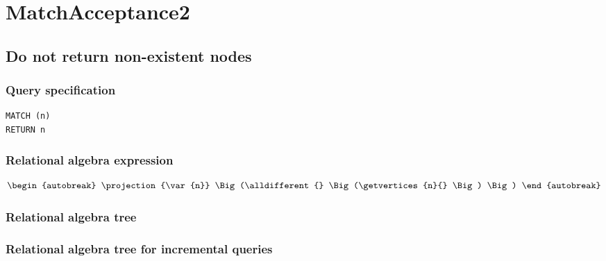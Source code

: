 \section{MatchAcceptance2}


\subsection{Do not return non-existent nodes}

\subsubsection*{Query specification}

\begin{lstlisting}
MATCH (n)
RETURN n
\end{lstlisting}

\subsubsection*{Relational algebra expression}

\begin{align*}
\begin{autobreak}
\projection{\var{n}} \Big(\alldifferent{} \Big(\getvertices{n}{}
\Big)
\Big)
\end{autobreak}
\end{align*}

\subsubsection*{Relational algebra tree}


\subsubsection*{Relational algebra tree for incremental queries}

